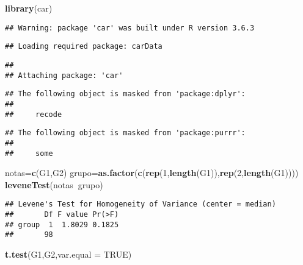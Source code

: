 \documentclass[
]{article}
\newenvironment{Shaded}{\begin{snugshade}}{\end{snugshade}}
\newcommand{\DataTypeTok}[1]{\textcolor[rgb]{0.13,0.29,0.53}{#1}}
\newcommand{\DecValTok}[1]{\textcolor[rgb]{0.00,0.00,0.81}{#1}}
\newcommand{\KeywordTok}[1]{\textcolor[rgb]{0.13,0.29,0.53}{\textbf{#1}}}
\newcommand{\NormalTok}[1]{#1}
\newcommand{\OperatorTok}[1]{\textcolor[rgb]{0.81,0.36,0.00}{\textbf{#1}}}
\newcommand{\OtherTok}[1]{\textcolor[rgb]{0.56,0.35,0.01}{#1}}
\begin{document}
\begin{Shaded}
\begin{Highlighting}[]
\KeywordTok{library}\NormalTok{(car)}
\end{Highlighting}
\end{Shaded}

\begin{verbatim}
## Warning: package 'car' was built under R version 3.6.3
\end{verbatim}

\begin{verbatim}
## Loading required package: carData
\end{verbatim}

\begin{verbatim}
## 
## Attaching package: 'car'
\end{verbatim}

\begin{verbatim}
## The following object is masked from 'package:dplyr':
## 
##     recode
\end{verbatim}

\begin{verbatim}
## The following object is masked from 'package:purrr':
## 
##     some
\end{verbatim}

\begin{Shaded}
\begin{Highlighting}[]
\NormalTok{notas=}\KeywordTok{c}\NormalTok{(G1,G2)}
\NormalTok{grupo=}\KeywordTok{as.factor}\NormalTok{(}\KeywordTok{c}\NormalTok{(}\KeywordTok{rep}\NormalTok{(}\DecValTok{1}\NormalTok{,}\KeywordTok{length}\NormalTok{(G1)),}\KeywordTok{rep}\NormalTok{(}\DecValTok{2}\NormalTok{,}\KeywordTok{length}\NormalTok{(G1))))}
\KeywordTok{leveneTest}\NormalTok{(notas}\OperatorTok{~}\NormalTok{grupo)}
\end{Highlighting}
\end{Shaded}

\begin{verbatim}
## Levene's Test for Homogeneity of Variance (center = median)
##       Df F value Pr(>F)
## group  1  1.8029 0.1825
##       98
\end{verbatim}

\begin{Shaded}
\begin{Highlighting}[]
\KeywordTok{t.test}\NormalTok{(G1,G2,}\DataTypeTok{var.equal =} \OtherTok{TRUE}\NormalTok{)}
\end{Highlighting}
\end{Shaded}
\end{document}
